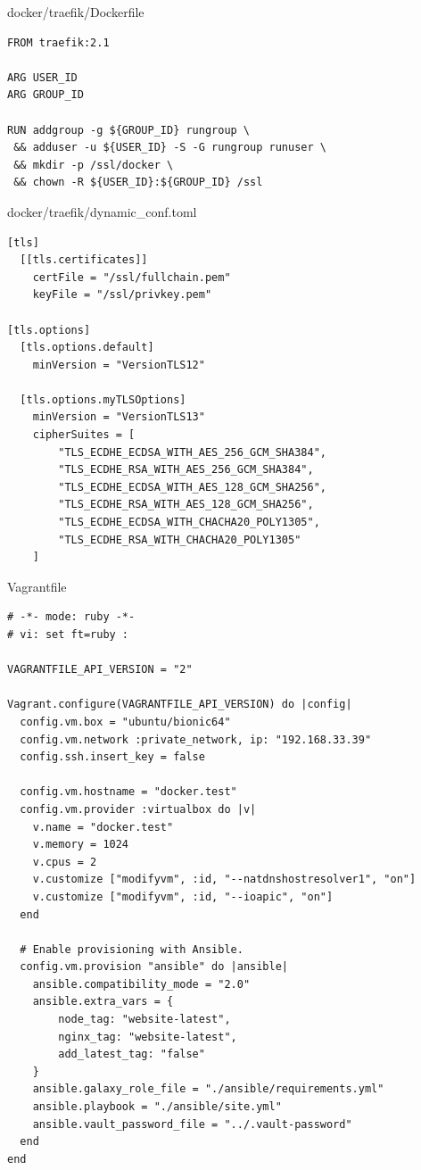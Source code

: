 docker/traefik/Dockerfile
\begin{verbatim}
FROM traefik:2.1

ARG USER_ID
ARG GROUP_ID

RUN addgroup -g ${GROUP_ID} rungroup \
 && adduser -u ${USER_ID} -S -G rungroup runuser \
 && mkdir -p /ssl/docker \
 && chown -R ${USER_ID}:${GROUP_ID} /ssl
\end{verbatim}

docker/traefik/dynamic\_conf.toml
\begin{verbatim}
[tls]
  [[tls.certificates]]
    certFile = "/ssl/fullchain.pem"
    keyFile = "/ssl/privkey.pem"

[tls.options]
  [tls.options.default]
    minVersion = "VersionTLS12"

  [tls.options.myTLSOptions]
    minVersion = "VersionTLS13"
    cipherSuites = [
        "TLS_ECDHE_ECDSA_WITH_AES_256_GCM_SHA384",
        "TLS_ECDHE_RSA_WITH_AES_256_GCM_SHA384",
        "TLS_ECDHE_ECDSA_WITH_AES_128_GCM_SHA256",
        "TLS_ECDHE_RSA_WITH_AES_128_GCM_SHA256",
        "TLS_ECDHE_ECDSA_WITH_CHACHA20_POLY1305",
        "TLS_ECDHE_RSA_WITH_CHACHA20_POLY1305"
    ]
\end{verbatim}

Vagrantfile
\begin{verbatim}
# -*- mode: ruby -*-
# vi: set ft=ruby :

VAGRANTFILE_API_VERSION = "2"

Vagrant.configure(VAGRANTFILE_API_VERSION) do |config|
  config.vm.box = "ubuntu/bionic64"
  config.vm.network :private_network, ip: "192.168.33.39"
  config.ssh.insert_key = false

  config.vm.hostname = "docker.test"
  config.vm.provider :virtualbox do |v|
    v.name = "docker.test"
    v.memory = 1024
    v.cpus = 2
    v.customize ["modifyvm", :id, "--natdnshostresolver1", "on"]
    v.customize ["modifyvm", :id, "--ioapic", "on"]
  end

  # Enable provisioning with Ansible.
  config.vm.provision "ansible" do |ansible|
    ansible.compatibility_mode = "2.0"
    ansible.extra_vars = {
        node_tag: "website-latest",
        nginx_tag: "website-latest",
        add_latest_tag: "false"
    }
    ansible.galaxy_role_file = "./ansible/requirements.yml"
    ansible.playbook = "./ansible/site.yml"
    ansible.vault_password_file = "../.vault-password"
  end
end
\end{verbatim}

